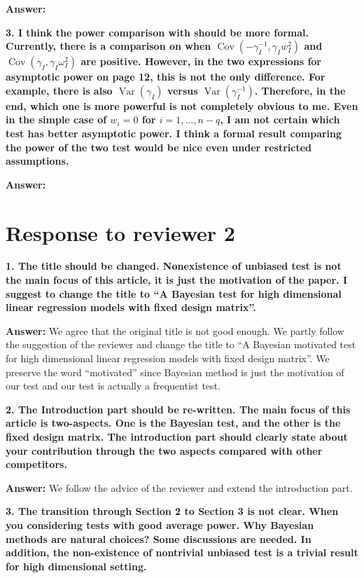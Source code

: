 \documentclass[11pt]{article}
\DeclareMathOperator{\myVar}{Var}
\DeclareMathOperator{\myCov}{Cov}
\theoremstyle{plain}
\theoremstyle{definition}
\theoremstyle{remark}
\begin{document}
\textbf{Answer:}

\textbf{
    3.
    I think the power comparison with \cite{Goeman2006} should be more
    formal. Currently, there is a comparison on when $\myCov(-\gamma_I^{-1}, \gamma_I w_I^2)$ and $\myCov(\gamma_I, \gamma_I \omega_I^2)$ are positive.
    However, in the two expressions for asymptotic power on page 12, this is not the only difference.
    For example, there is also $\myVar (\gamma_I)$ versus $\myVar(\gamma_I^{-1})$.
    Therefore, in the end, which one is more powerful is not completely obvious to me.
    Even in the simple case of $w_i = 0$ for $i = 1, ..., n−q$, I am not certain which test has better asymptotic power.
I think a formal result comparing the power of the two test would be nice
even under restricted assumptions.
}

\textbf{Answer:}


\section{Response to reviewer 2}

\textbf{
    1. The title should be changed. Nonexistence of unbiased test is not the main focus of this article, it is just the motivation of the paper. I suggest to change the title to ``A Bayesian test for high dimensional linear regression models with fixed design matrix''.
}

\textbf{Answer:}
We agree that the original title is not good enough.
We partly follow the suggestion of the reviewer and change the title to ``A Bayesian motivated test for high dimensional linear regression models with fixed design matrix''.
We preserve the word ``motivated'' since Bayesian method is just the motivation of our test and our test is actually a frequentist test.

\textbf{
    2. The Introduction part should be re-written.
    The main focus of this article is two-aspects.
    One is the Bayesian test, and the other is the fixed design matrix. 
    The introduction part should clearly state about your contribution through the two aspects compared with other competitors.
}

\textbf{Answer:}
We follow the advice of the reviewer and extend the introduction part.

\textbf{
    3. The transition through Section 2 to Section 3 is not clear.
    When you considering tests with good average power.
    Why Bayesian methods are natural choices?
    Some discussions are needed. In addition, the non-existence of nontrivial unbiased test is a trivial result for high dimensional setting.
}
\end{document}
